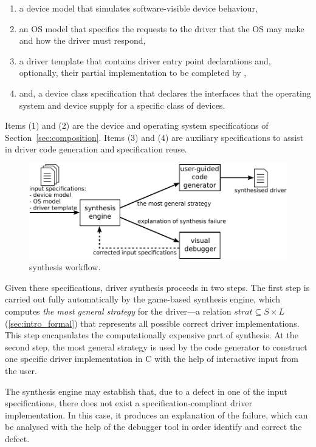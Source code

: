 \begin{enumerate}
    \item a device model that simulates software-visible device behaviour, 
    \item an OS model that specifies the requests to the driver that the OS may make and how the driver must respond,
    \item a driver template that contains driver entry point declarations and, optionally, their partial implementation to be completed by \termite,
    \item and, a device class specification that declares the interfaces that the operating system and device supply for a specific class of devices.
\end{enumerate}

\noindent Items (1) and (2) are the device and operating system specifications of Section~\ref{sec:composition}. Items (3) and (4) are auxiliary specifications to assist in driver code generation and specification reuse.

\begin{figure}
    \center
    \includegraphics[width=\linewidth]{imgs/termite.pdf}
    \caption{\termite synthesis workflow.}\label{f:termite}
\end{figure}

Given these specifications, driver synthesis proceeds in two steps.  The first step is carried out fully automatically by the \termite game-based synthesis engine, which computes \emph{the most general strategy} for the driver---a relation $strat \subseteq S \times L$ (\ref{sec:intro_formal}) that represents all possible correct driver implementations.  This step encapsulates the computationally expensive part of synthesis.  At the second step, the most general strategy is used by the \termite code generator to construct one specific driver implementation in C with the help of interactive input from the user.

The synthesis engine may establish that, due to a defect in one of the input specifications, there does not exist a specification-compliant driver implementation.  In this case, it produces an explanation of the failure, which can be analysed with the help of the \termite debugger tool in order identify and correct the defect.

